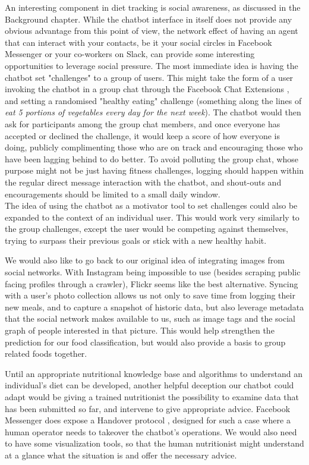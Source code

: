 An interesting component in diet tracking is social awareness, as discussed in the Background chapter. While the chatbot interface in itself does not provide any obvious advantage from this point of view, the network effect of having an agent that can interact with your contacts, be it your social circles in Facebook Messenger or your co-workers on Slack, can provide some interesting opportunities to leverage social pressure. The most immediate idea is having the chatbot set "challenges" to a group of users. This might take the form of a user invoking the chatbot in a group chat through the Facebook Chat Extensions \cite{chatextensions}, and setting a randomised "healthy eating" challenge (something along the lines of \textit{eat 5 portions of vegetables every day for the next week}). The chatbot would then ask for participants among the group chat members, and once everyone has accepted or declined the challenge, it would keep a score of how everyone is doing, publicly complimenting those who are on track and encouraging those who have been lagging behind to do better. To avoid polluting the group chat, whose purpose might not be just having fitness challenges, logging should happen within the regular direct message interaction with the chatbot, and shout-outs and encouragements should be limited to a small daily window. \\
The idea of using the chatbot as a motivator tool to set challenges could also be expanded to the context of an individual user. This would work very similarly to the group challenges, except the user would be competing against themselves, trying to surpass their previous goals or stick with a new healthy habit. 

We would also like to go back to our original idea of integrating images from social networks. With Instagram being impossible to use (besides scraping public facing profiles through a crawler), Flickr seems like the best alternative. Syncing with a user's photo collection allows us not only to save time from logging their new meals, and to capture a snapshot of historic data, but also leverage metadata that the social network makes available to us, such as image tags and the social graph of people interested in that picture. This would help strengthen the prediction for our food classification, but would also provide a basis to group related foods together. 

Until an appropriate nutritional knowledge base and algorithms to understand an individual's diet can be developed, another helpful deception our chatbot could adapt would be giving a trained nutritionist the possibility to examine data that has been submitted so far, and intervene to give appropriate advice. Facebook Messenger does expose a Handover protocol \cite{handoverfacebook}, designed for such a case where a human operator needs to takeover the chatbot's operations. We would also need to have some visualization tools, so that the human nutritionist might understand at a glance what the situation is and offer the necessary advice.
